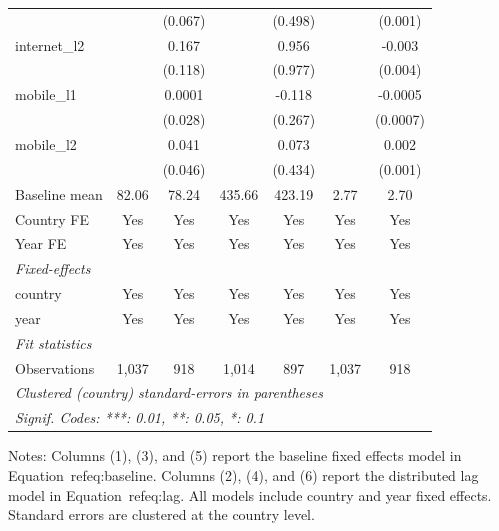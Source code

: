 \begin{table}[htbp]
\begin{tabular}{lcccccc}
                       &               & (0.067)       &             & (0.498)     &               & (0.001)\\   
      internet\_l2     &               & 0.167         &             & 0.956       &               & -0.003\\   
                       &               & (0.118)       &             & (0.977)     &               & (0.004)\\   
      mobile\_l1       &               & 0.0001        &             & -0.118      &               & -0.0005\\   
                       &               & (0.028)       &             & (0.267)     &               & (0.0007)\\   
      mobile\_l2       &               & 0.041         &             & 0.073       &               & 0.002\\   
                       &               & (0.046)       &             & (0.434)     &               & (0.001)\\   
      Baseline mean    & 82.06         & 78.24         & 435.66      & 423.19      & 2.77          & 2.70\\  
      Country FE       & Yes           & Yes           & Yes         & Yes         & Yes           & Yes\\  
      Year FE          & Yes           & Yes           & Yes         & Yes         & Yes           & Yes\\  
      \midrule
      \emph{Fixed-effects}\\
      country          & Yes           & Yes           & Yes         & Yes         & Yes           & Yes\\  
      year             & Yes           & Yes           & Yes         & Yes         & Yes           & Yes\\  
      \midrule
      \emph{Fit statistics}\\
      Observations     & 1,037         & 918           & 1,014       & 897         & 1,037         & 918\\  
      \midrule \midrule
      \multicolumn{7}{l}{\emph{Clustered (country) standard-errors in parentheses}}\\
      \multicolumn{7}{l}{\emph{Signif. Codes: ***: 0.01, **: 0.05, *: 0.1}}\\
   \end{tabular}
\begin{flushleft}
\footnotesize Notes: Columns (1), (3), and (5) report the baseline fixed effects model in Equation~ref{eq:baseline}. Columns (2), (4), and (6) report the distributed lag model in Equation~ref{eq:lag}. All models include country and year fixed effects. Standard errors are clustered at the country level.
\end{flushleft}
\end{table}
